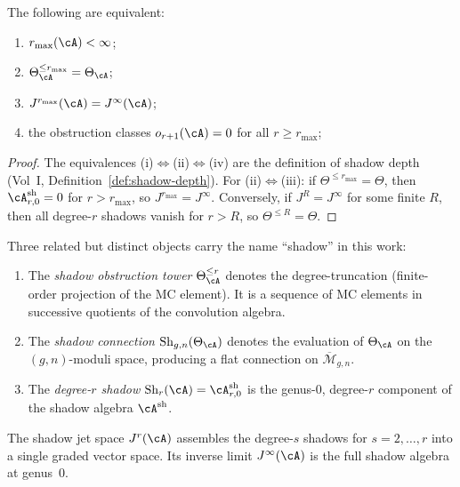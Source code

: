 \begin{theorem}
The following are equivalent:
\begin{enumerate}[label=\textup{(\roman*)}]
\item $r_{\max}(\cA) < \infty$;
\item $\Theta_\cA^{\leq r_{\max}} = \Theta_\cA$;
\item $J^{r_{\max}}(\cA) = J^\infty(\cA)$;
\item the obstruction classes $o_{r+1}(\cA) = 0$ for all $r \geq r_{\max}$;
\end{enumerate}
\end{theorem}

\begin{proof}
The equivalences (i)$\Leftrightarrow$(ii)$\Leftrightarrow$(iv) are the definition of shadow
depth (Vol~I, Definition~\ref*{def:shadow-depth}). For (ii)$\Leftrightarrow$(iii): if
$\Theta^{\leq r_{\max}} = \Theta$, then $\cA^{\mathrm{sh}}_{r,0} = 0$ for
$r > r_{\max}$, so $J^{r_{\max}} = J^\infty$. Conversely, if $J^R = J^\infty$ for
some finite $R$, then all degree-$r$ shadows vanish for $r > R$, so
$\Theta^{\leq R} = \Theta$.
\end{proof}

\begin{remark}
Three related but distinct objects carry the name ``shadow'' in this
work:
\begin{enumerate}[label=\textup{(\roman*)}]
\item The \emph{shadow obstruction tower} $\Theta_\cA^{\leq r}$ denotes the
 degree-truncation (finite-order projection of the MC element).
 It is a sequence of MC elements in successive quotients of the
 convolution algebra.
\item The \emph{shadow connection} $\operatorname{Sh}_{g,n}(\Theta_\cA)$
 denotes the evaluation of $\Theta_\cA$ on the $(g,n)$-moduli space,
 producing a flat connection on $\overline{\mathcal{M}}_{g,n}$.
\item The \emph{degree-$r$ shadow} $\operatorname{Sh}_r(\cA) =
 \cA^{\mathrm{sh}}_{r,0}$ is the genus-$0$, degree-$r$ component
 of the shadow algebra $\cA^{\mathrm{sh}}$.
\end{enumerate}
The shadow jet space $J^r(\cA)$ assembles the degree-$s$ shadows for
$s = 2, \ldots, r$ into a single graded vector space. Its inverse
limit $J^\infty(\cA)$ is the full shadow algebra at genus~$0$.
\end{remark}

